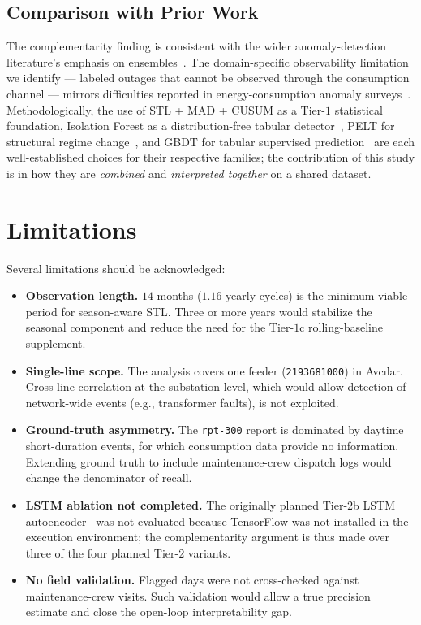 \documentclass{article}
\begin{document}
\subsection{Comparison with Prior Work}
The complementarity finding is consistent with the wider anomaly-detection literature's emphasis on ensembles~\cite{aggarwal2017ensemble,ahmad2017realtime}. The domain-specific observability limitation we identify --- labeled outages that cannot be observed through the consumption channel --- mirrors difficulties reported in energy-consumption anomaly surveys~\cite{himeur2021survey}. Methodologically, the use of STL + MAD + CUSUM as a Tier-$1$ statistical foundation, Isolation Forest as a distribution-free tabular detector~\cite{liu2008isolation}, PELT for structural regime change~\cite{killick2012pelt,truong2020ruptures}, and GBDT for tabular supervised prediction~\cite{friedman2001gbm,shwartz2022tabular} are each well-established choices for their respective families; the contribution of this study is in how they are \emph{combined} and \emph{interpreted together} on a shared dataset.

\section{Limitations}\label{sec:limitations}
Several limitations should be acknowledged:

\begin{itemize}[leftmargin=1.5em,itemsep=2pt]
  \item \textbf{Observation length.} $14$ months ($1.16$ yearly cycles) is the minimum viable period for season-aware STL. Three or more years would stabilize the seasonal component and reduce the need for the Tier-$1$c rolling-baseline supplement.

  \item \textbf{Single-line scope.} The analysis covers one feeder (\texttt{2193681000}) in Avc{\i}lar. Cross-line correlation at the substation level, which would allow detection of network-wide events (e.g., transformer faults), is not exploited.

  \item \textbf{Ground-truth asymmetry.} The \texttt{rpt-300} report is dominated by daytime short-duration events, for which consumption data provide no information. Extending ground truth to include maintenance-crew dispatch logs would change the denominator of recall.

  \item \textbf{LSTM ablation not completed.} The originally planned Tier-$2$b LSTM autoencoder~\cite{malhotra2016lstm} was not evaluated because TensorFlow was not installed in the execution environment; the complementarity argument is thus made over three of the four planned Tier-$2$ variants.

  \item \textbf{No field validation.} Flagged days were not cross-checked against maintenance-crew visits. Such validation would allow a true precision estimate and close the open-loop interpretability gap.
\end{itemize}




\end{document}
